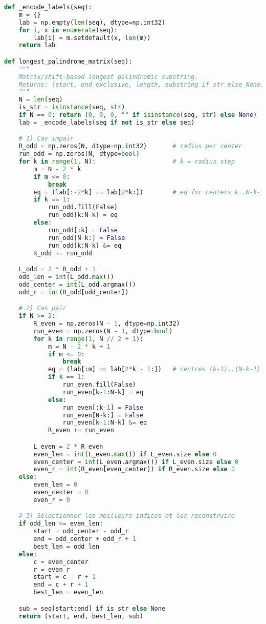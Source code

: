 \documentclass[12pt, a4paper]{article}
\begin{document}
\begin{lstlisting}[language=Python, label={code:palindrome4}]
def _encode_labels(seq):
    m = {}
    lab = np.empty(len(seq), dtype=np.int32)
    for i, x in enumerate(seq):
        lab[i] = m.setdefault(x, len(m))
    return lab

def longest_palindrome_matrix(seq):
    """
    Matrix/shift-based longest palindromic substring.
    Returns: (start, end_exclusive, length, substring_if_str_else_None)
    """
    N = len(seq)
    is_str = isinstance(seq, str)
    if N == 0: return (0, 0, 0, "" if isinstance(seq, str) else None)
    lab = _encode_labels(seq if not is_str else seq)

    # 1) Cas impair
    R_odd = np.zeros(N, dtype=np.int32)       # radius per center
    run_odd = np.zeros(N, dtype=bool)
    for k in range(1, N):                     # k = radius step
        m = N - 2 * k                         
        if m <= 0:
            break
        eq = (lab[:-2*k] == lab[2*k:])        # eq for centers k..N-k-1
        if k == 1:
            run_odd.fill(False)
            run_odd[k:N-k] = eq
        else:
            run_odd[:k] = False
            run_odd[N-k:] = False
            run_odd[k:N-k] &= eq
        R_odd += run_odd

    L_odd = 2 * R_odd + 1
    odd_len = int(L_odd.max())
    odd_center = int(L_odd.argmax())
    odd_r = int(R_odd[odd_center])

    # 2) Cas pair
    if N >= 2:
        R_even = np.zeros(N - 1, dtype=np.int32)
        run_even = np.zeros(N - 1, dtype=bool)
        for k in range(1, N // 2 + 1):
            m = N - 2 * k + 1
            if m <= 0:
                break
            eq = (lab[:m] == lab[2*k - 1:])   # centres (k-1)..(N-k-1)
            if k == 1:
                run_even.fill(False)
                run_even[k-1:N-k] = eq
            else:
                run_even[:k-1] = False
                run_even[N-k:] = False
                run_even[k-1:N-k] &= eq
            R_even += run_even

        L_even = 2 * R_even
        even_len = int(L_even.max()) if L_even.size else 0
        even_center = int(L_even.argmax()) if L_even.size else 0
        even_r = int(R_even[even_center]) if R_even.size else 0
    else:
        even_len = 0
        even_center = 0
        even_r = 0

    # 3) Sélectionner les meilleurs indices et les reconstruire
    if odd_len >= even_len:
        start = odd_center - odd_r
        end = odd_center + odd_r + 1
        best_len = odd_len
    else:
        c = even_center
        r = even_r
        start = c - r + 1
        end = c + r + 1
        best_len = even_len

    sub = seq[start:end] if is_str else None
    return (start, end, best_len, sub)
\end{lstlisting}
\clearpage
\end{document}
